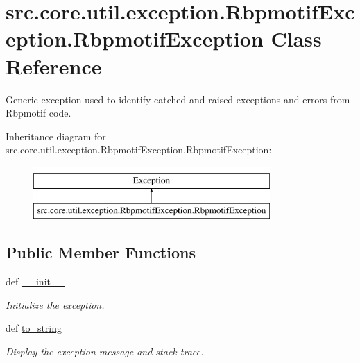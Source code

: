 \hypertarget{classsrc_1_1core_1_1util_1_1exception_1_1RbpmotifException_1_1RbpmotifException}{\section{src.\-core.\-util.\-exception.\-Rbpmotif\-Exception.\-Rbpmotif\-Exception Class Reference}
\label{classsrc_1_1core_1_1util_1_1exception_1_1RbpmotifException_1_1RbpmotifException}
}


Generic exception used to identify catched and raised exceptions and errors from Rbpmotif code.  


Inheritance diagram for src.\-core.\-util.\-exception.\-Rbpmotif\-Exception.\-Rbpmotif\-Exception\-:\begin{figure}[H]
\begin{center}
\leavevmode
\includegraphics[height=2.000000cm]{classsrc_1_1core_1_1util_1_1exception_1_1RbpmotifException_1_1RbpmotifException}
\end{center}
\end{figure}
\subsection*{Public Member Functions}
\begin{DoxyCompactItemize}
\item 
def \hyperlink{classsrc_1_1core_1_1util_1_1exception_1_1RbpmotifException_1_1RbpmotifException_a3b797e59ed7109a05ceb508119589713}{\-\_\-\-\_\-init\-\_\-\-\_\-}
\begin{DoxyCompactList}\small\item\em Initialize the exception. \end{DoxyCompactList}\item 
\hypertarget{classsrc_1_1core_1_1util_1_1exception_1_1RbpmotifException_1_1RbpmotifException_a443dea9337995b4587c7f9989948c9b1}{def \hyperlink{classsrc_1_1core_1_1util_1_1exception_1_1RbpmotifException_1_1RbpmotifException_a443dea9337995b4587c7f9989948c9b1}{to\-\_\-string}}\label{classsrc_1_1core_1_1util_1_1exception_1_1RbpmotifException_1_1RbpmotifException_a443dea9337995b4587c7f9989948c9b1}

\begin{DoxyCompactList}\small\item\em Display the exception message and stack trace. \end{DoxyCompactList}\end{DoxyCompactItemize}
